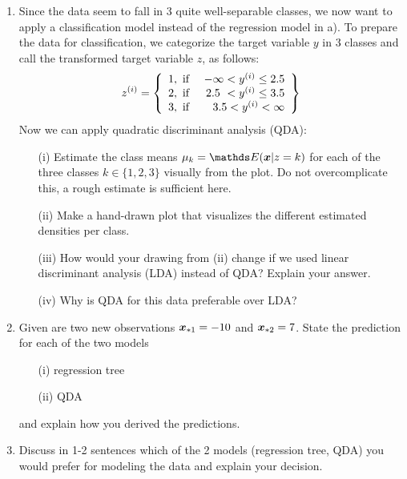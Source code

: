 \documentclass[a4paper]{article}
\newcounter{loes}
\begin{document}
{\begin{enumerate}
  \item Since the data seem to fall in 3 quite well-separable classes, we now 
  want to apply a classification model instead of the regression model in a). 
  To prepare the data for classification, we categorize the target variable $y$ 
  in 3 classes and call the transformed target variable $z$, as follows:
  \[
    z^{(i)} = \left\{\begin{array}{lr}
        1, \text{ if }&  -\infty < y^{(i)} \leq 2.5 \\
        2, \text{ if }&  2.5\ < y^{(i)} \leq 3.5 \\
        3, \text{ if }&  3.5 < y^{(i)} < \infty
        \end{array} \right\}
  \]
  Now we can apply quadratic discriminant analysis (QDA):
  \begin{enumerate}
    \item[(i)] Estimate the class means $\mu_k = \E(\xv|z = k)$ for each of the 
    three classes $k \in \{1, 2, 3\}$ visually from the plot. Do not 
    overcomplicate this, a rough estimate is sufficient here.
    \item[(ii)] Make a hand-drawn plot that visualizes the different estimated 
    densities per class.
    \item[(iii)] How would your drawing from (ii) change if we used linear 
    discriminant analysis (LDA) instead of QDA? Explain your answer.
    \item[(iv)] Why is QDA for this data preferable over LDA?
  \end{enumerate}  
  \item Given are two new observations $\bm{x}_{*1} = -10$ and $\bm{x}_{*2} = 7$. 
  State the prediction for each of the two models 
  \begin{enumerate}
    \item[(i)] regression tree
    \item[(ii)] QDA
  \end{enumerate}
  and explain how you derived the predictions.
  \item Discuss in 1-2 sentences which of the 2 models (regression tree, QDA) 
  you would prefer for modeling the data and explain your decision.
\end{enumerate}

\dlz
\loesung{

}}
\end{document}
